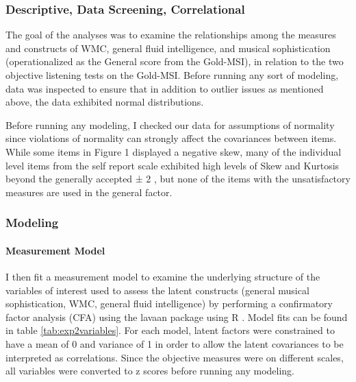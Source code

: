 \documentclass[12pt,]{book}
\let\oldparagraph\paragraph
\renewcommand{\paragraph}[1]{\oldparagraph{#1}\mbox{}}
\begin{document}
\hypertarget{descriptive-data-screening-correlational}{%
\subsubsection{Descriptive, Data Screening, Correlational}\label{descriptive-data-screening-correlational}}

The goal of the analyses was to examine the relationships among the measures and constructs of WMC, general fluid intelligence, and musical sophistication (operationalized as the General score from the Gold-MSI), in relation to the two objective listening tests on the Gold-MSI.
Before running any sort of modeling, data was inspected to ensure that in addition to outlier issues as mentioned above, the data exhibited normal distributions.

Before running any modeling, I checked our data for assumptions of normality since violations of normality can strongly affect the covariances between items.
While some items in Figure 1 displayed a negative skew, many of the individual level items from the self report scale exhibited high levels of Skew and Kurtosis beyond the generally accepted ± 2 \citep{fieldDiscoveringStatisticsUsing2012}, but none of the items with the unsatisfactory measures are used in the general factor.

\hypertarget{modeling}{%
\subsubsection{Modeling}\label{modeling}}

\hypertarget{measurement-model}{%
\paragraph{Measurement Model}\label{measurement-model}}

I then fit a measurement model to examine the underlying structure of the variables of interest used to assess the latent constructs (general musical sophistication, WMC, general fluid intelligence) by performing a confirmatory factor analysis (CFA) using the lavaan package \citep{rosseelLavaanPackageStructural2012} using R \citep{teamLanguageEnvironmentStatistical2015}.
Model fits can be found in table \ref{tab:exp2variables}.
For each model, latent factors were constrained to have a mean of 0 and variance of 1 in order to allow the latent covariances to be interpreted as correlations.
Since the objective measures were on different scales, all variables were converted to z scores before running any modeling.
\end{document}
